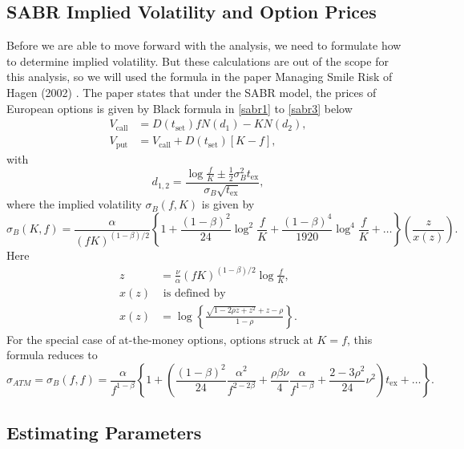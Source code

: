 \subsection{SABR Implied Volatility and Option Prices}
Before we are able to move forward with the analysis,
we need to formulate how to determine implied volatility. 
But these calculations are out of the scope for this analysis,
so we will used the formula in the paper Managing Smile Risk 
of Hagen (2002) \cite{Smile}. The paper states that
under the SABR model, the prices of European options 
is given by Black formula in \autoref{sabr1} to \autoref{sabr3}
below
\begin{align}
    V_{\text{call}} &= D(t_{\text{set}})fN(d_1) - KN(d_2),  \label{sabr1}\\
    V_{\text{put}} &= V_{\text{call}} + D(t_{\text{set}})[K - f], \label{sabr2}
\end{align}
with
\begin{equation}
d_{1,2} = \frac{\log \frac{f}{K} \pm \frac{1}{2}\sigma_B^2 t_{\text{ex}}}{\sigma_B \sqrt{t_{\text{ex}}}}, \label{sabr3}
\end{equation}
where the implied volatility $\sigma_B(f, K)$ is given by
\begin{equation}
\sigma_B(K, f) = \frac{\alpha}{(fK)^{(1-\beta)/2}} \left\{ 1 + \frac{(1-\beta)^2}{24} \log^2 \frac{f}{K} + \frac{(1-\beta)^4}{1920} \log^4 \frac{f}{K} + \ldots \right\} \left( \frac{z}{x(z)} \right).
\end{equation}
Here
\begin{align}
z &= \frac{\nu}{\alpha}(fK)^{(1-\beta)/2} \log \frac{f}{K}, \\
x(z) &\text{ is defined by} \\
x(z) &= \log \left\{ \frac{\sqrt{1-2\rho z + z^2} + z - \rho}{1 - \rho} \right\}.
\end{align}
For the special case of at-the-money options, options struck at $K = f$, this formula reduces to
\begin{equation}
\sigma_{ATM} = \sigma_B(f, f) = \frac{\alpha}{f^{1-\beta}} \left\{ 1 + \left( \frac{(1-\beta)^2}{24} \frac{\alpha^2}{f^{2-2\beta}} + \frac{\rho \beta \nu}{4} \frac{\alpha}{f^{1-\beta}} + \frac{2-3\rho^2}{24} \nu^2 \right) t_{\text{ex}} + \ldots \right\}.
\end{equation}


\subsection{Estimating Parameters}